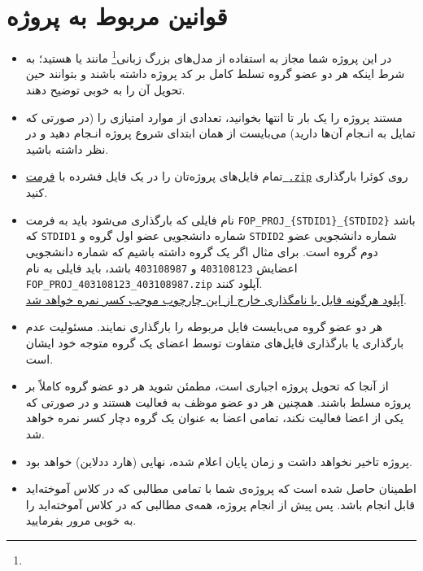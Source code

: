 \section{قوانین مربوط به پروژه}

\begin{itemize}
    \item {
        در این پروژه شما مجاز به استفاده از مدل‌های بزرگ زبانی\footnote{} مانند  یا  هستید؛ به شرط اینکه هر دو عضو گروه تسلط کامل بر کد پروژه داشته باشند و بتوانند حین تحویل آن را به خوبی توضیح دهند.
    }
    \item {
        مستند پروژه را یک بار تا انتها بخوانید، تعدادی از موارد امتیازی را (در صورتی که تمایل به انـجام آن‌ها دارید) می‌بایست از همان ابتدای شروع پروژه انـجام دهید و در نظر داشته باشید.
    }
    \item {
        تمام فایل‌های پروژه‌تان را در یک فایل فشرده با \underline{فرمت \,\texttt{.zip}}  روی کوئرا بارگذاری کنید.
    }
    \item {
        نام فایلی که بارگذاری می‌شود باید به فرمت \texttt{FOP\_PROJ\_\{STDID1\}\_\{STDID2\}} باشد که \texttt{STDID1} شماره دانشجویی عضو اول گروه و \texttt{STDID2} شماره دانشجویی عضو دوم گروه است.
        برای مثال اگر یک گروه داشته باشیم که شماره دانشجویی اعضایش \texttt{403108123} و \texttt{403108987} باشد،
        باید فایلی به نام \texttt{FOP\_PROJ\_403108123\_403108987.zip} آپلود کنند.\\
        {\large \underline{آپلود هرگونه فایل با نامگذاری خارج از این چارچوب موجب کسر نمره خواهد شد}.}
    }
    \item {
        هر دو عضو گروه می‌بایست فایل مربوطه را بارگذاری نمایند. مسئولیت عدم بارگذاری یا بارگذاری فایل‌های متفاوت توسط اعضای یک گروه متوجه خود ایشان است.
    }
    \item {
        از آنجا که تحویل پروژه اجباری است، مطمئن شوید هر دو عضو گروه کاملاً بر پروژه مسلط باشند. همچنین هر دو عضو موظف به فعالیت هستند و در صورتی که یکی از اعضا فعالیت نکند، تمامی اعضا به عنوان یک گروه دچار کسر نمره خواهد شد.
    }
    \item {
        پروژه تاخیر نخواهد داشت و زمان پایان اعلام شده، نهایی (هارد ددلاین) خواهد بود.
    }
    \item {
        اطمینان حاصل شده است که پروژه‌ی شما با تمامی مطالبی که در کلاس آموخته‌اید قابل انجام باشد. پس پیش از انجام پروژه، همه‌ی مطالبی که در کلاس آموخته‌اید را به خوبی مرور بفرمایید.
    }
\end{itemize}
